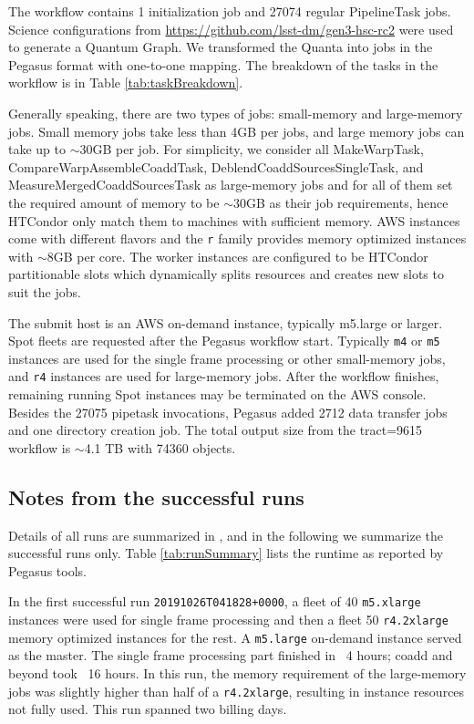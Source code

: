 The workflow contains 1 initialization job and 27074 regular PipelineTask jobs.
Science configurations from \url{https://github.com/lsst-dm/gen3-hsc-rc2} were used to generate a Quantum Graph.
We transformed the Quanta into jobs in the Pegasus format with one-to-one mapping.
The breakdown of the tasks in the workflow is in Table \ref{tab:taskBreakdown}.



Generally speaking, there are two types of jobs: small-memory and large-memory jobs.
Small memory jobs take less than 4GB per jobs, and large memory jobs can take up to $\sim$30GB per job.
For simplicity, we consider all MakeWarpTask, CompareWarpAssembleCoaddTask, DeblendCoaddSourcesSingleTask, and MeasureMergedCoaddSourcesTask as large-memory jobs and for all of them set the required amount of memory to be $\sim$30GB as their job requirements, hence HTCondor only match them to machines with sufficient memory.
AWS instances come with different flavors and the \texttt{r} family provides memory optimized instances with $\sim$8GB per core.
The worker instances are configured to be HTCondor partitionable slots which dynamically splits resources and creates new slots to suit the jobs.

The submit host is an AWS on-demand instance, typically m5.large or larger.
Spot fleets are requested after the Pegasus workflow start.
Typically \texttt{m4} or \texttt{m5} instances are used for the single frame processing or other small-memory jobs, and \texttt{r4} instances are used for large-memory jobs.
After the workflow finishes, remaining running Spot instances may be terminated on the AWS console.
Besides the 27075 pipetask invocations, Pegasus added 2712 data transfer jobs and one directory creation job.
The total output size from the tract=9615 workflow is $\sim$4.1 TB with 74360 objects.

\subsection{Notes from the successful runs}

Details of all runs are summarized in , and in the following we summarize the successful runs only.
Table \ref{tab:runSummary} lists the runtime as reported by Pegasus tools.



In the first successful run \texttt{20191026T041828+0000}, a fleet of 40 \texttt{m5.xlarge} instances were used for single frame processing and then a fleet 50 \texttt{r4.2xlarge} memory optimized instances for the rest.
A \texttt{m5.large} on-demand instance served as the master.
The single frame processing part finished in ~4 hours; coadd and beyond took ~16 hours.
In this run, the memory requirement of the large-memory jobs was slightly higher than half of a \texttt{r4.2xlarge}, resulting in instance resources not fully used.
This run spanned two billing days.

